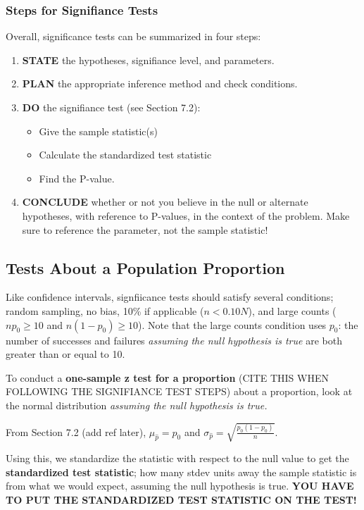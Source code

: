 \documentclass[12pt, a4paper]{article}
\theoremstyle{definition}
\begin{document}
\subsubsection{Steps for Signifiance Tests}
Overall, significance tests can be summarized in four steps:
\begin{enumerate}
    \item \textbf{STATE} the hypotheses, signifiance level, and parameters.
    \item \textbf{PLAN} the appropriate inference method and check conditions.
    \item \textbf{DO} the signifiance test (see Section 7.2): \begin{itemize}
        \item Give the sample statistic(s)
        \item Calculate the standardized test statistic
        \item Find the P-value.
    \end{itemize}
    \item \textbf{CONCLUDE} whether or not you believe in the null or alternate hypotheses, with reference to P-values, in the context of the problem. Make sure to reference the parameter, not the sample statistic!
\end{enumerate}

\subsection{Tests About a Population Proportion}

Like confidence intervals, signfiicance tests should satisfy several conditions; random sampling, no bias, 10\% if applicable ($n < 0.10N$), and large counts ($np_0 \geq 10$ and $n(1-p_0) \geq 10$).
Note that the large counts condition uses $p_0$: the number of successes and failures \textit{assuming the null hypothesis is true} are both greater than or equal to 10.

To conduct a \textbf{one-sample z test for a proportion} (CITE THIS WHEN FOLLOWING THE SIGNIFIANCE TEST STEPS) about a proportion, look at the normal distribution \textit{assuming the null hypothesis is true.}

From Section 7.2 (add ref later), $\mu_{\hat{p}} = p_0$ and $\sigma_{\hat{p}} = \sqrt{\frac{p_0(1-p_0)}{n}}$.

Using this, we standardize the statistic with respect to the null value to get the \textbf{standardized test statistic}; how many stdev units away the sample statistic is from what we would expect, assuming the null hypothesis is true.
\textbf{YOU HAVE TO PUT THE STANDARDIZED TEST STATISTIC ON THE TEST!}
\end{document}
